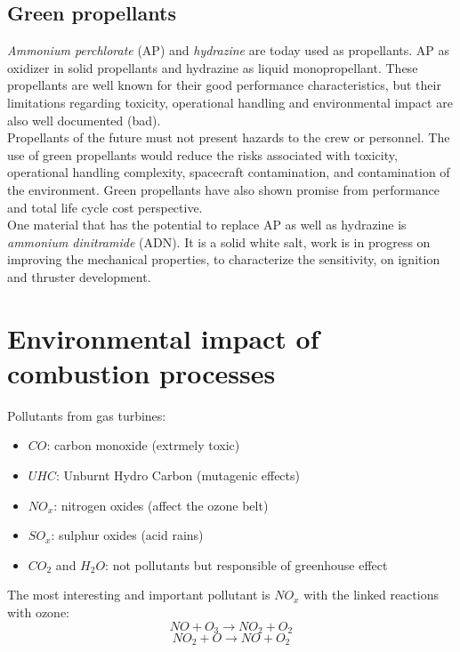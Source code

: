 \documentclass[12pt]{article}
\begin{document}
\subsection{Green propellants}

\textit{Ammonium perchlorate} (AP) and \textit{hydrazine} are today used as propellants. AP as oxidizer in solid propellants and hydrazine as liquid monopropellant. These propellants are well known for their good performance characteristics, but their limitations regarding toxicity, operational handling and environmental impact are also well documented (bad).\\
Propellants of the future must not present hazards to the crew or personnel. The use of green propellants would reduce the risks associated with toxicity, operational handling complexity, spacecraft contamination, and contamination of the environment. Green propellants have also shown promise from performance and total life cycle cost perspective.\\
One material that has the potential to replace AP as well as hydrazine is \textit{ammonium dinitramide} (ADN). It is a solid white salt, work is in progress on improving the mechanical properties, to characterize the sensitivity, on ignition and thruster development.

\newpage

\section{Environmental impact of combustion processes}

Pollutants from gas turbines:
\begin{itemize}
    \item $CO$: carbon monoxide (extrmely toxic)
    \item $UHC$: Unburnt Hydro Carbon (mutagenic effects)
    \item $NO_{x}$: nitrogen oxides (affect the ozone belt)
    \item $SO_{x}$: sulphur oxides (acid rains)
    \item $CO_{2}$ and $H_{2}O$: not pollutants but responsible of greenhouse effect
\end{itemize}

The most interesting and important pollutant is $NO_{x}$ with the linked reactions with ozone:
\begin{equation}
    NO+O_{3} \rightarrow NO_{2}+O_{2}
\end{equation}
\begin{equation}
    NO_{2}+O \rightarrow NO+O_{2}
\end{equation}
\end{document}
